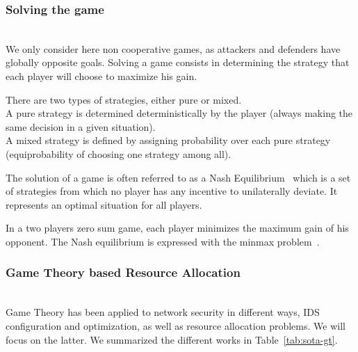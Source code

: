 \subsubsection{Solving the game}\textbf{\\}
We only consider here non cooperative games, as attackers and defenders have globally opposite goals.
Solving a game consists in determining the strategy that each player will choose to maximize his gain.

There are two types of strategies, either pure or mixed.\\
A pure strategy is determined deterministically by the player (\ie always making the same decision in a given situation).\\
A mixed strategy is defined by assigning probability over each pure strategy (\eg equiprobability of choosing one strategy among all).

The solution of a game is often referred to as a Nash Equilibrium~\cite{nasheq} which is a set of strategies from which no player has any incentive to unilaterally deviate. It represents an optimal situation for all players.

In a two players zero sum game, each player minimizes the maximum gain of his opponent. 
The Nash equilibrium is expressed with the minmax problem~\cite{minmax}.

\subsubsection{Game Theory based Resource Allocation}\textbf{\\}
Game Theory has been applied to network security in different ways, IDS configuration and optimization, as well as resource allocation problems. We will focus on the latter. We summarized the different works in Table~\ref{tab:sota-gt}.

